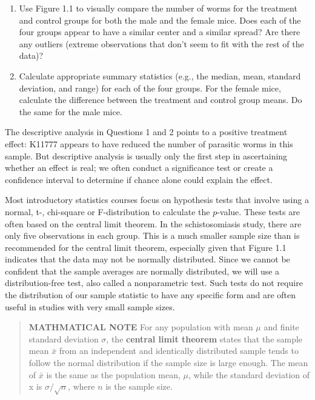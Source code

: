 \documentclass[
]{book}
\begin{document}
\begin{enumerate}
\def\labelenumi{\arabic{enumi}.}
\item
  Use Figure 1.1 to visually compare the number of worms for the treatment and control groups for both the male and the female mice. Does each of the four groups appear to have a similar center and a similar spread? Are there any outliers (extreme observations that don't seem to fit with the rest of the data)?
\item
  Calculate appropriate summary statistics (e.g., the median, mean, standard deviation, and range) for each of the four groups. For the female mice, calculate the difference between the treatment and control group means. Do the same for the male mice.
\end{enumerate}

The descriptive analysis in Questions 1 and 2 points to a positive treatment effect: K11777 appears to have reduced the number of parasitic worms in this sample. But descriptive analysis is usually only the first step in ascertaining whether an effect is real; we often conduct a significance test or create a confidence interval to determine if chance alone could explain the effect.

Most introductory statistics courses focus on hypothesis tests that involve using a normal, t-, chi-square or F-distribution to calculate the \(p\)-value. These tests are often based on the central limit theorem. In the schistosomiasis study, there are only five observations in each group. This is a much smaller sample size than is recommended for the central limit theorem, especially given that Figure 1.1 indicates that the data may not be normally distributed. Since we cannot be confident that the sample averages are normally distributed, we will use a distribution-free test, also called a nonparametric test. Such tests do not require
the distribution of our sample statistic to have any specific form and are often useful in studies with very small sample sizes.

\begin{quote}
\textbf{MATHMATICAL NOTE} For any population with mean \(\mu\) and finite standard deviation \(\sigma\), the \textbf{central limit theorem} states that the sample mean \(\bar{x}\) from an independent and identically distributed sample tends to follow the normal distribution if the sample size is large enough. The mean of \(\bar{x}\) is the same as the population mean, \(\mu\), while the standard deviation of x is \(\sigma / \sqrt{n}\), where \(n\) is the sample size.
\end{quote}
\end{document}
